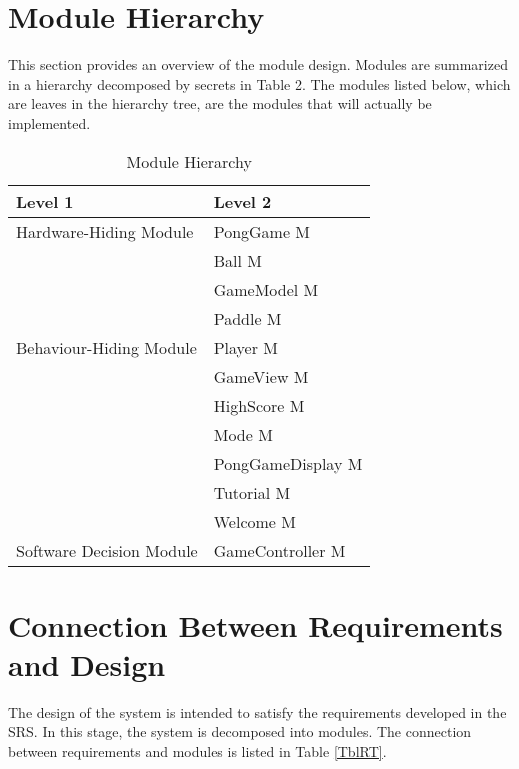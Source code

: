\documentclass[12pt,letterpaper]{article}
\newcounter{mnum}
\newcommand{\mthemnum}{M\themnum}
\begin{document}
	\section{Module Hierarchy} \label{SecMH}
	This section provides an overview of the module design. Modules are summarized in a hierarchy decomposed by secrets in Table 2. The modules listed below, which are leaves in the hierarchy tree, are the modules that will actually be implemented.


\begin{table}[h!]
\centering
\begin{tabular}{p{} p{}}
\toprule
\textbf{Level 1} & \textbf{Level 2}\\
\midrule
{Hardware-Hiding Module} & PongGame {mnum} \mthemnum \label{mHH} \\ 
\midrule
\multirow{7}{0.3\textwidth}{Behaviour-Hiding Module} 
& Ball {mnum} \mthemnum \label{mBall} \\
& GameModel {mnum} \mthemnum \label{mGM}\\
& Paddle {mnum} \mthemnum \label{mPad}\\
& Player {mnum} \mthemnum \label{mPlayer}\\
& GameView {mnum} \mthemnum \label{mV}\\
& HighScore {mnum} \mthemnum \label{mScore}\\
& Mode {mnum} \mthemnum \label{mMode}\\
& PongGameDisplay {mnum} \mthemnum \label{mDisplay}\\
& Tutorial {mnum} \mthemnum \label{mTut}\\
& Welcome {mnum} \mthemnum \label{mWel}\\
\midrule
\multirow{2}{0.3\textwidth}{Software Decision Module} & GameController {mnum} \mthemnum \label{mCon}\\

\bottomrule
\end{tabular}
\caption{Module Hierarchy}
\label{TblMH}
\end{table}


	\section{Connection Between Requirements and Design} \label{SecConnection}
	The design of the system is intended to satisfy the requirements developed in the SRS. In this stage, the system is decomposed into modules. The connection between requirements and modules is listed in Table  \ref{TblRT}.
\end{document}
